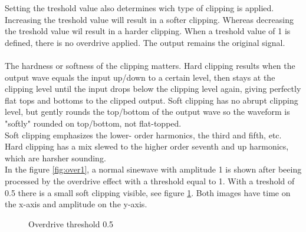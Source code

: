 Setting the treshold value also determines wich type of clipping is applied. Increasing the treshold value will result in a softer clipping. Whereas decreasing the treshold value wil result in a harder clipping. When a treshold value of 1 is defined, there is no overdrive applied. The output remains the original signal. \\ \\
The hardness or softness of the clipping matters. Hard clipping results when the output wave equals the input up/down to a certain level, then stays at the clipping level until the input drops below the clipping level again, giving perfectly flat tops and bottoms to the clipped output. Soft clipping has no abrupt clipping level, but gently rounds the top/bottom of the output wave so the waveform is "softly" rounded on top/bottom, not flat-topped.\\
Soft clipping emphasizes the lower- order harmonics, the third and fifth, etc. Hard clipping has a mix slewed to the higher order seventh and up harmonics, which are harsher sounding. \\
In the figure \ref{fig:over1}, a normal sinewave with amplitude 1 is shown after beeing processed by the overdrive effect with a threshold equal to 1. With a treshold of 0.5 there is a small soft clipping visible, see figure \ref{fig:over2}. Both images have time on the x-axis and amplitude on the y-axis.
\begin{figure}[ht]
  \hfill
  \begin{minipage}[t]{.45\textwidth}
    \begin{center}  
      \caption{Overdrive threshold 1}
      \label{fig:over1}
    \end{center}
  \end{minipage}
  \hfill
  \begin{minipage}[t]{.45\textwidth}
    \begin{center}  
      \caption{Overdrive threshold 0.5}
      \label{fig:over2}
    \end{center}
  \end{minipage}
  \hfill
\end{figure}
